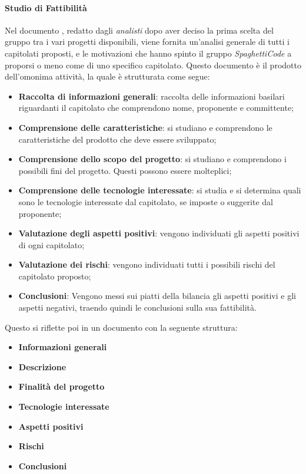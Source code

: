 \documentclass[../norme_di_progetto.tex]{subfiles}
\begin{document}
\paragraph{Studio di Fattibilità}
Nel documento \textsc{}, redatto dagli \emph{analisti} dopo aver deciso la prima scelta del gruppo tra i vari progetti disponibili, viene fornita un'analisi generale di tutti i capitolati proposti, e le motivazioni che hanno spinto il gruppo \emph{SpaghettiCode} a proporsi o meno come  di uno specifico capitolato. Questo documento è il prodotto dell'omonima attività, la quale è strutturata come segue: 
\begin{itemize}
    \item \textbf{Raccolta di informazioni generali}: raccolta delle informazioni basilari riguardanti il capitolato che comprendono nome, proponente e committente;
    \item \textbf{Comprensione delle caratteristiche}: si studiano e comprendono le caratteristiche del prodotto che deve essere sviluppato;
    \item \textbf{Comprensione dello scopo del progetto}: si studiano e comprendono i possibili fini del progetto. Questi possono essere molteplici;
    \item \textbf{Comprensione delle tecnologie interessate}: si studia e si determina quali sono le tecnologie interessate dal capitolato, se imposte o suggerite dal proponente;
    \item \textbf{Valutazione degli aspetti positivi}: vengono individuati gli aspetti positivi di ogni capitolato;
    \item \textbf{Valutazione dei rischi}: vengono individuati tutti i possibili rischi del capitolato proposto;  
    \item \textbf{Conclusioni}: Vengono messi sui piatti della bilancia gli aspetti positivi e gli aspetti negativi, traendo quindi le conclusioni sulla sua fattibilità.
\end{itemize}
Questo si riflette poi in un documento con la seguente struttura:
\begin{itemize}
    \item \textbf{Informazioni generali}
    \item \textbf{Descrizione}
    \item \textbf{Finalità del progetto}
    \item \textbf{Tecnologie interessate}
    \item \textbf{Aspetti positivi}
    \item \textbf{Rischi}
    \item \textbf{Conclusioni}
\end{itemize}
\end{document}
